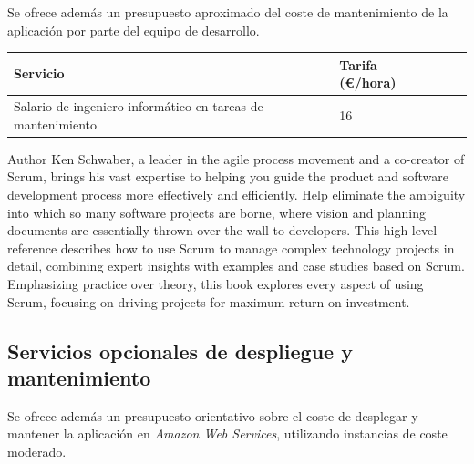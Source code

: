 \documentclass[10pt, a4paper]{aqademic}
\begin{document}
Se ofrece además un presupuesto aproximado del coste de mantenimiento de la aplicación por parte del equipo de desarrollo.

\begin{table}[h!]
	\begin{center}
		\begin{tabular}{|l|l|l|l|}
			\hline
			\rowcolor[HTML]{EFEFEF} 
			\textbf{Servicio}                   & \textbf{Tarifa (€/hora)} \\ \hline
			Salario de ingeniero informático en tareas de mantenimiento & 16   \\ \hline
		\end{tabular}
	\end{center}
\end{table}
 Author Ken Schwaber, a leader in the agile process movement and a co-creator of Scrum, brings his vast expertise to helping you guide the product and software development process more effectively and efficiently. Help eliminate the ambiguity into which so many software projects are borne, where vision and planning documents are essentially thrown over the wall to developers. This high-level reference describes how to use Scrum to manage complex technology projects in detail, combining expert insights with examples and case studies based on Scrum. Emphasizing practice over theory, this book explores every aspect of using Scrum, focusing on driving projects for maximum return on investment.


\subsection*{Servicios opcionales de despliegue y mantenimiento}

Se ofrece además un presupuesto orientativo sobre el coste de desplegar y mantener la aplicación en \textit{Amazon Web Services}, utilizando instancias de coste moderado.
\end{document}
